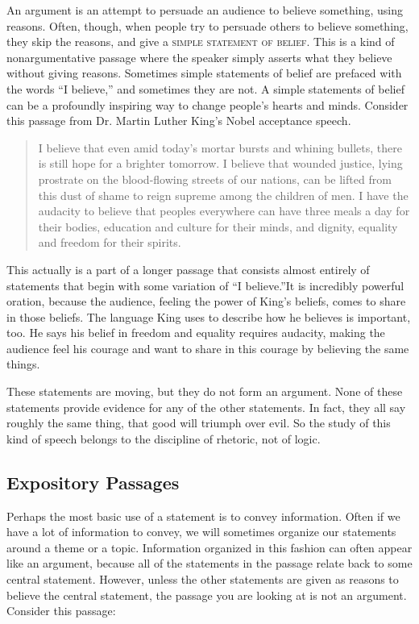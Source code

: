 An argument is an attempt to persuade an audience to believe something, using reasons. Often, though, when people try to persuade others to believe something, they skip the reasons, and give a \textsc{\gls{simple statement of belief}}. \label{def:simple_statement_of_belief} This is a kind of nonargumentative passage where the speaker simply asserts what they believe without giving reasons. Sometimes simple statements of belief are prefaced with the words ``I believe,'' and sometimes they are not. A simple statements of belief can be a profoundly inspiring way to change people's hearts and minds. Consider this passage from Dr. Martin Luther King's Nobel acceptance speech.

\begin{quotation} \noindent I believe that even amid today's mortar bursts and whining bullets, there is still hope for a brighter tomorrow. I believe that wounded justice, lying prostrate on the blood-flowing streets of our nations, can be lifted from this dust of shame to reign supreme among the children of men. I have the audacity to believe that peoples everywhere can have three meals a day for their bodies, education and culture for their minds, and dignity, equality and freedom for their spirits. \citep{King2001} \end{quotation}

This actually is a part of a longer passage that consists almost entirely of statements that begin with some variation of ``I believe.''It is incredibly powerful oration, because the audience, feeling the power of King's beliefs, comes to share in those beliefs. The language King uses to describe how he believes is important, too. He says his belief in freedom and equality requires audacity, making the audience feel his courage and want to share in this courage by believing the same things. 

These statements are moving, but they do not form an argument. None of these statements provide evidence for any of the other statements. In fact, they all say roughly the same thing, that good will triumph over evil. So the study of this kind of speech belongs to the discipline of rhetoric, not of logic.  
  
\subsection{Expository Passages}

Perhaps the most basic use of a statement is to convey information. Often if we have a lot of information to convey, we will sometimes organize our statements around a theme or a topic. Information organized in this fashion can often appear like an argument, because all of the statements in the passage relate back to some central statement. However, unless the other statements are given as reasons to believe the central statement, the passage you are looking at is not an argument. Consider this passage:

